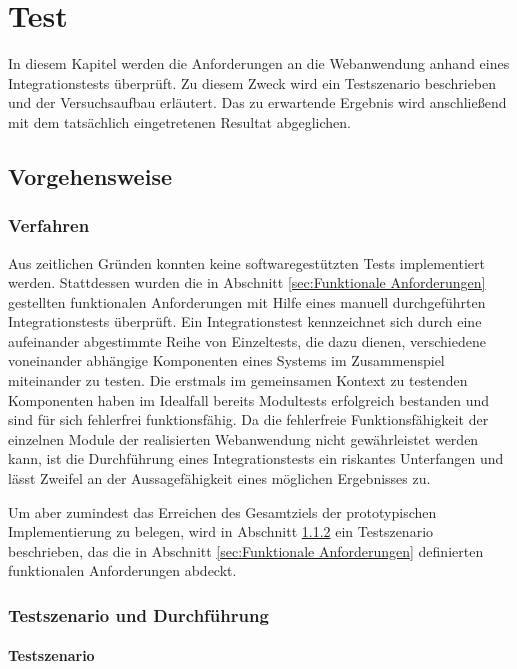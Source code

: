 \chapter{Test}
\label{cha:Test}
In diesem Kapitel werden die Anforderungen an die Webanwendung anhand eines Integrationstests überprüft. Zu diesem Zweck wird ein Testszenario beschrieben und der Versuchsaufbau erläutert. Das zu erwartende Ergebnis wird anschließend mit dem tatsächlich eingetretenen Resultat abgeglichen.

\section{Vorgehensweise}
\subsection{Verfahren}

Aus zeitlichen Gründen konnten keine softwaregestützten Tests implementiert werden. Stattdessen wurden die in Abschnitt \ref{sec:Funktionale Anforderungen} gestellten funktionalen Anforderungen mit Hilfe eines manuell durchgeführten Integrationstests überprüft. Ein Integrationstest kennzeichnet sich durch eine aufeinander abgestimmte Reihe von Einzeltests, die dazu dienen, verschiedene voneinander abhängige Komponenten eines Systems im Zusammenspiel miteinander zu testen. Die erstmals im gemeinsamen Kontext zu testenden Komponenten haben im Idealfall bereits Modultests erfolgreich bestanden und sind für sich fehlerfrei funktionsfähig. Da die fehlerfreie Funktionsfähigkeit der einzelnen Module der realisierten Webanwendung nicht gewährleistet werden kann, ist die Durchführung eines Integrationstests ein riskantes Unterfangen und lässt Zweifel an der Aussagefähigkeit eines möglichen Ergebnisses zu.

Um aber zumindest das Erreichen des Gesamtziels der prototypischen Implementierung zu belegen, wird in Abschnitt \ref{sec:test:Planung und Ablauf} ein Testszenario beschrieben, das die in Abschnitt \ref{sec:Funktionale Anforderungen} definierten funktionalen Anforderungen abdeckt.

\subsection{Testszenario und Durchführung}
\label{sec:test:Planung und Ablauf}

\subsubsection{Testszenario} 

